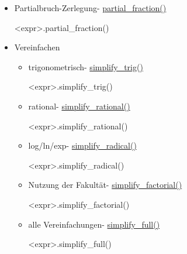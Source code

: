 \documentclass[a4paper,9pt,DIV15,twocolumn]{scrartcl}
\begin{document}
\begin{itemize}
   \item Partialbruch-Zerlegung- \href{https://sage.math.uni-goettingen.de/doc/static/reference/sage/symbolic/expression.html?highlight=simplify_full#sage.symbolic.expression.Expression.partial_fraction}{partial\_fraction()}
       \begin{sagein}
<expr>.partial_fraction()
       \end{sagein}
   \item Vereinfachen
   \begin{itemize}
       \item  trigonometrisch- \href{https://sage.math.uni-goettingen.de/doc/static/reference/sage/symbolic/expression.html?highlight=simplify_full#sage.symbolic.expression.Expression.simplify_trig}{simplify\_trig()}
       \begin{sagein}
<expr>.simplify_trig() 
       \end{sagein}
        \item rational- \href{https://sage.math.uni-goettingen.de/doc/static/reference/sage/symbolic/expression.html?highlight=simplify_full#sage.symbolic.expression.Expression.simplify_rational}{simplify\_rational()}
       \begin{sagein}
<expr>.simplify_rational() 
       \end{sagein}
        \item log/ln/exp- \href{https://sage.math.uni-goettingen.de/doc/static/reference/sage/symbolic/expression.html?highlight=simplify_full#sage.symbolic.expression.Expression.simplify_radical}{simplify\_radical()}
       \begin{sagein}
<expr>.simplify_radical() 
       \end{sagein}
        \item Nutzung der Fakultät- \href{https://sage.math.uni-goettingen.de/doc/static/reference/sage/symbolic/expression.html?highlight=simplify_full#sage.symbolic.expression.Expression.simplify_factorial}{simplify\_factorial()}
       \begin{sagein}
<expr>.simplify_factorial()
       \end{sagein}
        \item alle Vereinfachungen- \href{https://sage.math.uni-goettingen.de/doc/static/reference/sage/symbolic/expression.html?highlight=simplify_full#sage.symbolic.expression.Expression.simplify_full}{simplify\_full()}
       \begin{sagein}
<expr>.simplify_full()
       \end{sagein}
       \end{itemize}

  \end{itemize}
\end{document}

